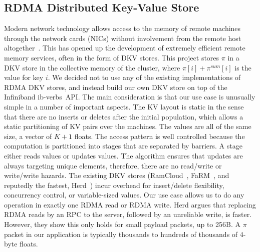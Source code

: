 \subsection{RDMA Distributed Key-Value Store}

Modern network technology allows access to the memory of remote machines
through the network cards (NICs) without involvement from the remote host
altogether~\cite{Hamada_infinibandtrade,Beck:2011:PER:2043535.2043537}.
This has opened up the development of
extremely efficient remote memory services, often in the form of DKV stores.
This project stores $\pi$ in a DKV store in the collective memory of the
cluster, where $\pi[i]+\pi^{sum}[i]$ is the value for key $i$. We decided not
to use any of the existing implementations of RDMA DKV stores, and instead
build our own DKV store on top of the Infiniband ib-verbs~API. The
main consideration is that our use case is unusually simple in a number
of important aspects. The KV layout is static in the sense that there are
no inserts or deletes after the initial population, which allows a static
partitioning of KV pairs over the machines. The values are all of the same size,
a vector of $K+1$ floats. The access pattern is well controlled because the
computation is partitioned into stages that are separated by barriers. A
stage either reads values or updates values. The algorithm ensures that updates
are always targeting unique elements,
therefore, there are no read/write or write/write hazards. The existing DKV
stores (RamCloud~\cite{Ousterhout:2015:RSS:2818727.2806887}, FaRM~\cite{179767},
and reputedly the fastest, Herd~\cite{Kalia:2014:URE:2740070.2626299}) incur
overhead for insert/delete flexibility, concurrency control, or variable-sized
values. Our use case allows us to do any operation in exactly one RDMA read
or RDMA write. Herd argues
that replacing RDMA reads by
an RPC to the server, followed by an unreliable write, is faster. However,
they show this only holds for small payload packets, up to 256B. A $\pi$
packet in our application is typically thousands to hundreds of thousands
of 4-byte floats.
